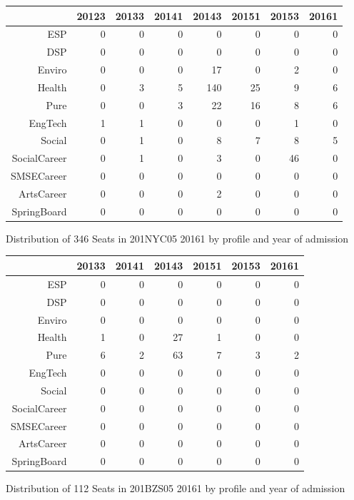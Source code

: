 \documentclass{article}\usepackage[]{graphicx}\usepackage[]{color}
\begin{document}
\begin{figure}[H]
\centering
\begin{tabular}{rrrrrrrr}
  \hline
 & 20123 & 20133 & 20141 & 20143 & 20151 & 20153 & 20161 \\ 
  \hline
ESP &   0 &   0 &   0 &   0 &   0 &   0 &   0 \\ 
  DSP &   0 &   0 &   0 &   0 &   0 &   0 &   0 \\ 
  Enviro &   0 &   0 &   0 &  17 &   0 &   2 &   0 \\ 
  Health &   0 &   3 &   5 & 140 &  25 &   9 &   6 \\ 
  Pure &   0 &   0 &   3 &  22 &  16 &   8 &   6 \\ 
  EngTech &   1 &   1 &   0 &   0 &   0 &   1 &   0 \\ 
  Social &   0 &   1 &   0 &   8 &   7 &   8 &   5 \\ 
  SocialCareer &   0 &   1 &   0 &   3 &   0 &  46 &   0 \\ 
  SMSECareer &   0 &   0 &   0 &   0 &   0 &   0 &   0 \\ 
  ArtsCareer &   0 &   0 &   0 &   2 &   0 &   0 &   0 \\ 
  SpringBoard &   0 &   0 &   0 &   0 &   0 &   0 &   0 \\ 
   \hline
\end{tabular}
\caption{Distribution of 346 Seats in 201NYC05 20161 by profile and year of admission} 
\end{figure}
\begin{figure}[H]
\centering
\begin{tabular}{rrrrrrr}
  \hline
 & 20133 & 20141 & 20143 & 20151 & 20153 & 20161 \\ 
  \hline
ESP &   0 &   0 &   0 &   0 &   0 &   0 \\ 
  DSP &   0 &   0 &   0 &   0 &   0 &   0 \\ 
  Enviro &   0 &   0 &   0 &   0 &   0 &   0 \\ 
  Health &   1 &   0 &  27 &   1 &   0 &   0 \\ 
  Pure &   6 &   2 &  63 &   7 &   3 &   2 \\ 
  EngTech &   0 &   0 &   0 &   0 &   0 &   0 \\ 
  Social &   0 &   0 &   0 &   0 &   0 &   0 \\ 
  SocialCareer &   0 &   0 &   0 &   0 &   0 &   0 \\ 
  SMSECareer &   0 &   0 &   0 &   0 &   0 &   0 \\ 
  ArtsCareer &   0 &   0 &   0 &   0 &   0 &   0 \\ 
  SpringBoard &   0 &   0 &   0 &   0 &   0 &   0 \\ 
   \hline
\end{tabular}
\caption{Distribution of 112 Seats in 201BZS05 20161 by profile and year of admission} 
\end{figure}
\end{document}
